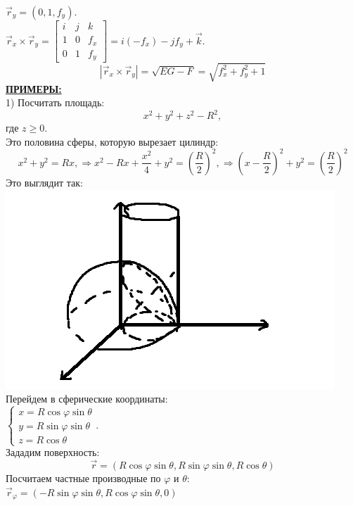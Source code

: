 \documentclass[12pt]{article}
\begin{document}
$\overrightarrow{r}_y = (0,1,f_y)$.\\
$\overrightarrow{r}_x \times \overrightarrow{r}_y = \begin{bmatrix} i & j & k \\ 1 & 0 & f_x \\ 0 & 1 & f_y \end{bmatrix} = i (-f_x) - j f_y + \overrightarrow{k}$.\\
$$|\overrightarrow{r}_x \times \overrightarrow{r}_y| = \sqrt{EG - F} = \sqrt{f_x^2 + f_y^2 +1}$$
\uline{\textbf{ПРИМЕРЫ:}}\\
1) Посчитать площадь:\\
$$x^2 + y^2 + z^2 - R^2,$$
где $z \geq 0$.\\
Это половина сферы, которую вырезает цилиндр:\\
$$x^2 + y^2 = Rx, \Rightarrow x^2 - Rx + \frac{x^2}{4} + y^2 = (\frac{R}{2})^2, \Rightarrow (x-\frac{R}{2})^2 + y^2 = (\frac{R}{2})^2$$
Это выглядит так:\\
\includegraphics{halfSphereAndCylindr1}\\
Перейдем в сферические координаты:\\
$\begin{cases} x = R\cos\varphi \sin\theta \\ y = R \sin \varphi \sin \theta \\ z = R \cos \theta \end{cases}$.\\
Зададим поверхность:\\
$$\overrightarrow{r} = (R\cos\varphi \sin\theta, R\sin\varphi \sin\theta, R\cos\theta)$$
Посчитаем частные производные по $\varphi$ и $\theta$:\\
$\overrightarrow{r}_\varphi = (-R \sin \varphi \sin \theta, R\cos\varphi \sin \theta, 0)$\\
\end{document}

